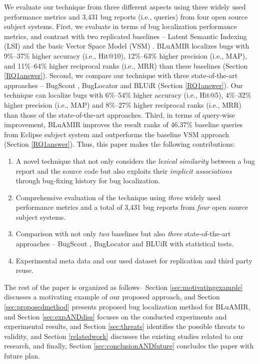 \documentclass[sigconf,review,anonymous]{acmart}
\begin{document}
We evaluate our technique from three different aspects using
three widely used performance metrics and 3,431 bug reports (i.e.,
queries) from four open source subject systems. 
First, we evaluate in terms of bug localization performance metrics, and contrast with two replicated baselines -- Latent Semantic Indexing (LSI) \cite{MarcusLSI} and the basic Vector Space Model (VSM) \cite{vector-space-model}.
BLuAMIR localizes bugs with 9\%--37\% higher accuracy (i.e., Hit@10), 12\%--63\% higher precision (i.e., MAP), and 11\%--64\% higher reciprocal ranks (i.e., MRR) than these baselines (Section  \ref{RQ1answer}).
Second, we compare our technique with three state-of-the-art approaches -- BugScout \cite{Nguyen}, BugLocator \cite{Jian} and BLUiR \cite{Saha} (Section \ref{RQ1answer}).
Our technique can localize bugs with 6\%--54\% higher accuracy (i.e., Hit@5), 4\%--32\% higher precision (i.e., MAP) and 8\%--27\% higher reciprocal ranks (i.e., MRR) than those of the state-of-the-art approaches.
Third, in terms of query-wise improvement, BLuAMIR improves the result ranks of 46.37\% baseline queries from Eclipse subject system and outperforms the baseline VSM approach (Section \ref{RQ1answer}).
Thus, this paper makes the following contributions:
\begin{enumerate}[noitemsep,topsep=0pt]
	\item A novel technique that not only considers the \emph{lexical similarity} between a bug report and the source code but also exploits their \emph{implicit associations} through bug-fixing history for bug localization.
	\item Comprehensive evaluation of the technique using \emph{three} widely used performance metrics and a total of 3,431 bug reports from \emph{four} open source subject systems.
	\item Comparison with not only \emph{two} baselines \cite{vector-space-model,MarcusLSI} but also \emph{three} state-of-the-art approaches -- BugScout \cite{Nguyen}, BugLocator \cite{Jian} and BLUiR \cite{Saha} with statistical tests.
	\item Experimental meta data and our used dataset for  replication and third party reuse.
\end{enumerate}

The rest of the paper is organized as follows-- Section \ref{sec:motivatingexample} discusses a motivating example of our proposed approach, and Section \ref{sec:proposedmethod} presents proposed bug localization method for BLuAMIR, and Section \ref{sec:expANDdiss} focuses on the conducted experiments and experimental results, and Section \ref{sec:threats} identifies the possible threats to validity, and Section \ref{relatedwork}
discusses the existing studies related to our research, and finally,  
Section \ref{sec:conclusionANDfuture} concludes the paper with future plan.
\end{document}
